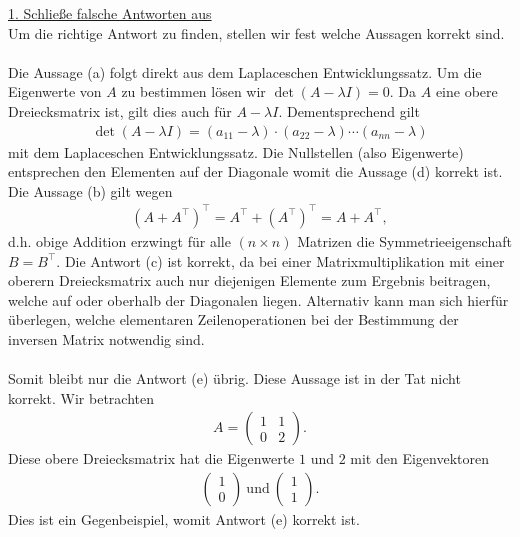 \underline{1. Schließe falsche Antworten aus}\\
Um die richtige Antwort zu finden, stellen wir fest welche Aussagen korrekt sind.\\
\\
Die Aussage (a) folgt direkt aus dem Laplaceschen Entwicklungssatz. Um die Eigenwerte von $A$ zu bestimmen lösen wir $\det(A - \lambda I) = 0$. Da $A$ eine obere Dreiecksmatrix ist, gilt dies auch für $A - \lambda I$. Dementsprechend gilt
\begin{align*}
	\det(A - \lambda I)
	=(a_{11} - \lambda) \cdot (a_{22} - \lambda) \cdots (a_{nn} - \lambda)
\end{align*}
mit dem Laplaceschen Entwicklungssatz. Die Nullstellen (also Eigenwerte) entsprechen den Elementen auf der Diagonale womit die Aussage (d) korrekt ist.
Die Aussage (b) gilt wegen
\begin{align*}
	(A + A^\top)^\top 
	= A^\top + \left( A^\top \right)^\top  
	= A + A^\top,
\end{align*}
d.h. obige Addition erzwingt für alle $(n \times n)$ Matrizen die Symmetrieeigenschaft $B = B^\top$.
Die Antwort (c) ist korrekt, da bei einer Matrixmultiplikation mit einer oberern Dreiecksmatrix auch nur diejenigen Elemente zum Ergebnis beitragen, welche auf oder oberhalb der Diagonalen liegen. Alternativ kann man sich hierfür überlegen, welche elementaren Zeilenoperationen bei der Bestimmung der inversen Matrix notwendig sind.\\
\\
Somit bleibt nur die Antwort (e) übrig. Diese Aussage ist in der Tat nicht korrekt.
Wir betrachten
\begin{align*}
	A =
	\begin{pmatrix}
		1 & 1 \\
		0 & 2
	\end{pmatrix}.
\end{align*}
Diese obere Dreiecksmatrix hat die Eigenwerte $1$ und $2$ mit den Eigenvektoren
\begin{align*}
	\begin{pmatrix}
		1\\
		0
	\end{pmatrix}
	\ \text{und} \
	\begin{pmatrix}
		1\\
		1
	\end{pmatrix}.
\end{align*}
Dies ist ein Gegenbeispiel, womit Antwort (e) korrekt ist.
